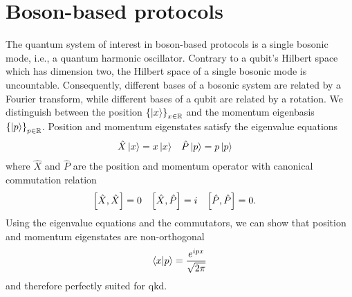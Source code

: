\section{Boson-based protocols}

The quantum system of interest in boson-based protocols is a single bosonic mode, i.e., a quantum harmonic oscillator.
Contrary to a qubit's Hilbert space which has dimension two, the Hilbert space of a single bosonic mode is uncountable.
Consequently, different bases of a bosonic system are related by a Fourier transform, while different bases of a qubit are related by a rotation.
We distinguish between the position $\left\{\ket{x}\right\}_{x\in\mathbb{R}}$ and the momentum eigenbasis $\left\{\ket{p}\right\}_{p\in\mathbb{R}}$.
Position and momentum eigenstates satisfy the eigenvalue equations
\begin{align}
	\hat{X}\ket{x}
	&=
	x\ket{x}
	&
	\hat{P}\ket{p}
	&=
	p\ket{p}
\end{align}
where $\hat{X}$ and $\hat{P}$ are the position and momentum operator with canonical commutation relation
\begin{align}
	\comm{\hat{X}}{\hat{X}}
	&=
	0
	&
	\comm{\hat{X}}{\hat{P}}
	&=
	i
	&
	\comm{\hat{P}}{\hat{P}}
	&=
	0
	.
\end{align}
Using the eigenvalue equations and the commutators, we can show that position and momentum eigenstates
are non-orthogonal~\cite[p.~29]{Mukhanov2007}
\begin{equation}
	\braket{x}{p}
	=
	\frac{e^{ipx}}{\sqrt{2\pi}}
\end{equation}
and therefore perfectly suited for \gls{qkd}.

